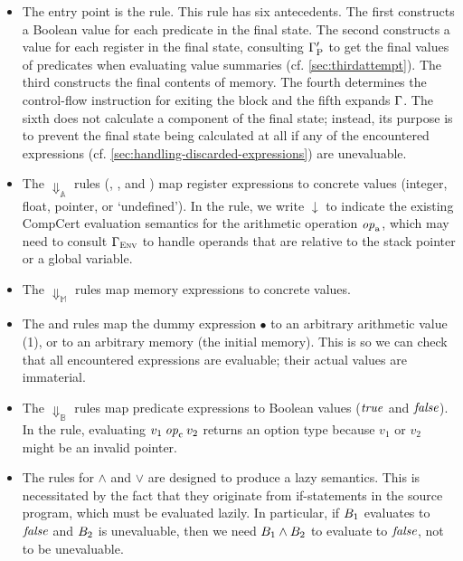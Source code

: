 {\begin{itemize}
\item The entry point is the  rule. This rule has six
  antecedents. The first constructs a Boolean value for each predicate in the
  final state. The second constructs a value for each register in the final
  state, consulting $\Gamma'_{\mathrm{P}}$ to get the final values of
  predicates when evaluating value summaries (cf. \cref{sec:thirdattempt}). The
  third constructs the final contents of memory. The fourth determines the
  control-flow instruction for exiting the block and the fifth expands
  $\Gamma$. The sixth does not calculate a component of the final state;
  instead, its purpose is to prevent the final state being calculated at all if
  any of the encountered expressions
  (cf. \cref{sec:handling-discarded-expressions}) are unevaluable.

\item The $\Downarrow_{\mathbb{A}}$ rules (,
  , and ) map register expressions to
  concrete values (integer, float, pointer, or `undefined'). In the
   rule, we write $\downarrow$ to indicate the existing
  CompCert evaluation semantics for the arithmetic operation $\mathit{op}_{\mathrm{a}}$, which
  may need to consult $\Gamma_{\mathrm{\textsc{Env}}}$ to handle operands that are
  relative to the stack pointer or a global variable.

\item The $\Downarrow_{\mathbb{M}}$ rules map memory expressions to concrete
  values.

\item The  and  rules map the
  dummy expression $\bullet$ to an arbitrary arithmetic value (1), or to an
  arbitrary memory (the initial memory). This is so we can check that all
  encountered expressions are evaluable; their actual values are immaterial.

\item The $\Downarrow_{\mathbb{B}}$ rules map predicate expressions to Boolean
  values ($\mathit{true}$ and $\mathit{false}$). In the  rule,
  evaluating $v_1\mathbin{\mathit{op}_{\mathrm{c}}}v_2$ returns an option type because $v_1$ or
  $v_2$ might be an invalid pointer.

\item The rules for $\land$ and $\lor$ are designed to produce a lazy
  semantics. This is necessitated by the fact that they originate from
  if-statements in the source program, which must be evaluated lazily.
  In particular, if $B_1$ evaluates to $\mathit{false}$ and $B_2$
  is unevaluable, then we need $B_1 \land B_2$ to evaluate to
  $\mathit{false}$, not to be unevaluable.


\end{itemize}}
